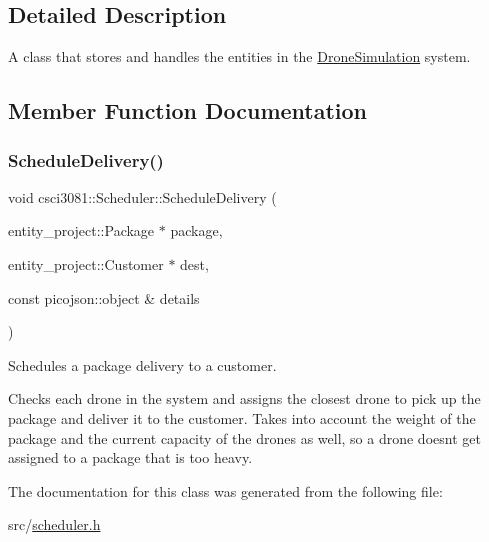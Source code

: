 \subsection{Detailed Description}
A class that stores and handles the entities in the \hyperlink{classcsci3081_1_1DroneSimulation}{Drone\+Simulation} system. 

\subsection{Member Function Documentation}
\mbox{\label{classcsci3081_1_1Scheduler_a06bd24b65f0c52349475eb6ccc661322}} 
\subsubsection{\texorpdfstring{Schedule\+Delivery()}{ScheduleDelivery()}}
{\footnotesize\ttfamily void csci3081\+::\+Scheduler\+::\+Schedule\+Delivery (\begin{DoxyParamCaption}\item[{entity\+\_\+project\+::\+Package $\ast$}]{package,  }\item[{entity\+\_\+project\+::\+Customer $\ast$}]{dest,  }\item[{const picojson\+::object \&}]{details }\end{DoxyParamCaption})\hspace{0.3cm}{\ttfamily [inline]}}



Schedules a package delivery to a customer. 

Checks each drone in the system and assigns the closest drone to pick up the package and deliver it to the customer. Takes into account the weight of the package and the current capacity of the drones as well, so a drone doesn\textquotesingle{}t get assigned to a package that is too heavy. 

The documentation for this class was generated from the following file\+:\begin{DoxyCompactItemize}
\item 
src/\hyperlink{scheduler_8h}{scheduler.\+h}\end{DoxyCompactItemize}
